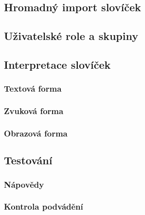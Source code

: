 \documentclass[a4paper,11pt,titlepage,fleqn]{article}
\begin{document}
        \subsection{Hromadný import slovíček}

    \subsection{Uživatelské role a skupiny}

    \subsection{Interpretace slovíček}

        \subsubsection{Textová forma}

        \subsubsection{Zvuková forma}

        \subsubsection{Obrazová forma}

    \subsection{Testování}

        \subsubsection{Nápovědy}

        \subsubsection{Kontrola podvádění}
\end{document}
